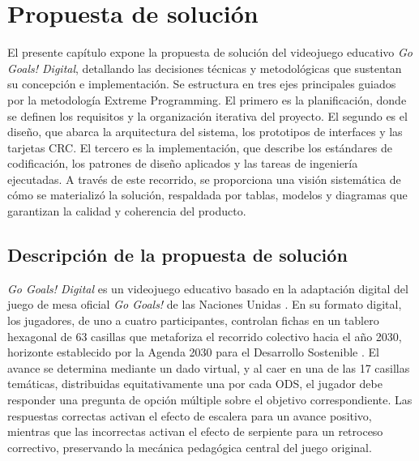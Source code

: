 \chapter{Propuesta de solución}
\label{chap:chapter2}

El presente capítulo expone la propuesta de solución del videojuego educativo \textit{Go Goals! Digital}, detallando las decisiones técnicas y metodológicas que sustentan su concepción e implementación. Se estructura en tres ejes principales guiados por la metodología Extreme Programming. El primero es la planificación, donde se definen los requisitos y la organización iterativa del proyecto. El segundo es el diseño, que abarca la arquitectura del sistema, los prototipos de interfaces y las tarjetas CRC. El tercero es la implementación, que describe los estándares de codificación, los patrones de diseño aplicados y las tareas de ingeniería ejecutadas. A través de este recorrido, se proporciona una visión sistemática de cómo se materializó la solución, respaldada por tablas, modelos y diagramas que garantizan la calidad y coherencia del producto.

\section{Descripción de la propuesta de solución}
\label{sec:descripcion_propuesta}

\textit{Go Goals! Digital} es un videojuego educativo basado en la adaptación digital del juego de mesa oficial \textit{Go Goals!} de las Naciones Unidas \parencite{GoGoals2020}. En su formato digital, los jugadores, de uno a cuatro participantes, controlan fichas en un tablero hexagonal de 63 casillas que metaforiza el recorrido colectivo hacia el año 2030, horizonte establecido por la Agenda 2030 para el Desarrollo Sostenible \parencite{NacionesUnidas2015}. El avance se determina mediante un dado virtual, y al caer en una de las 17 casillas temáticas, distribuidas equitativamente una por cada ODS, el jugador debe responder una pregunta de opción múltiple sobre el objetivo correspondiente. Las respuestas correctas activan el efecto de escalera para un avance positivo, mientras que las incorrectas activan el efecto de serpiente para un retroceso correctivo, preservando la mecánica pedagógica central del juego original.

